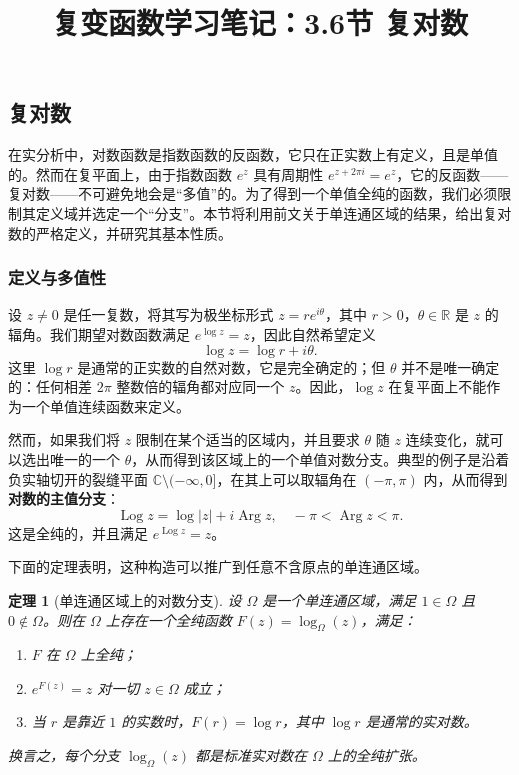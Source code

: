 \documentclass[UTF8]{ctexart}
\title{复变函数学习笔记：3.6节 复对数}
\author{}
\date{}
\newtheorem{theorem}{定理}[section]
\numberwithin{equation}{section}
\newcommand{\RR}{\mathbb{R}}
\newcommand{\CC}{\mathbb{C}}
\begin{document}
\maketitle

\setcounter{section}{3}
\setcounter{subsection}{5}
\subsection{复对数}

在实分析中，对数函数是指数函数的反函数，它只在正实数上有定义，且是单值的。然而在复平面上，由于指数函数 $e^z$ 具有周期性 $e^{z+2\pi i}=e^z$，它的反函数——复对数——不可避免地会是“多值”的。为了得到一个单值全纯的函数，我们必须限制其定义域并选定一个“分支”。本节将利用前文关于单连通区域的结果，给出复对数的严格定义，并研究其基本性质。

\subsubsection{定义与多值性}

设 $z\neq0$ 是任一复数，将其写为极坐标形式 $z=re^{i\theta}$，其中 $r>0$，$\theta\in\RR$ 是 $z$ 的辐角。我们期望对数函数满足 $e^{\log z}=z$，因此自然希望定义
\[
\log z = \log r + i\theta .
\]
这里 $\log r$ 是通常的正实数的自然对数，它是完全确定的；但 $\theta$ 并不是唯一确定的：任何相差 $2\pi$ 整数倍的辐角都对应同一个 $z$。因此，$\log z$ 在复平面上不能作为一个单值连续函数来定义。

然而，如果我们将 $z$ 限制在某个适当的区域内，并且要求 $\theta$ 随 $z$ 连续变化，就可以选出唯一的一个 $\theta$，从而得到该区域上的一个单值对数分支。典型的例子是沿着负实轴切开的裂缝平面 $\CC\setminus(-\infty,0]$，在其上可以取辐角在 $(-\pi,\pi)$ 内，从而得到\textbf{对数的主值分支}：
\[
\operatorname{Log} z = \log|z| + i\operatorname{Arg} z,\quad -\pi<\operatorname{Arg} z<\pi .
\]
这是全纯的，并且满足 $e^{\operatorname{Log} z}=z$。

下面的定理表明，这种构造可以推广到任意不含原点的单连通区域。

\begin{theorem}[单连通区域上的对数分支]
设 $\Omega$ 是一个单连通区域，满足 $1\in\Omega$ 且 $0\notin\Omega$。则在 $\Omega$ 上存在一个全纯函数 $F(z)=\log_{\Omega}(z)$，满足：
\begin{enumerate}
    \item[(i)] $F$ 在 $\Omega$ 上全纯；
    \item[(ii)] $e^{F(z)}=z$ 对一切 $z\in\Omega$ 成立；
    \item[(iii)] 当 $r$ 是靠近 $1$ 的实数时，$F(r)=\log r$，其中 $\log r$ 是通常的实对数。
\end{enumerate}
换言之，每个分支 $\log_{\Omega}(z)$ 都是标准实对数在 $\Omega$ 上的全纯扩张。
\end{theorem}
\end{document}
